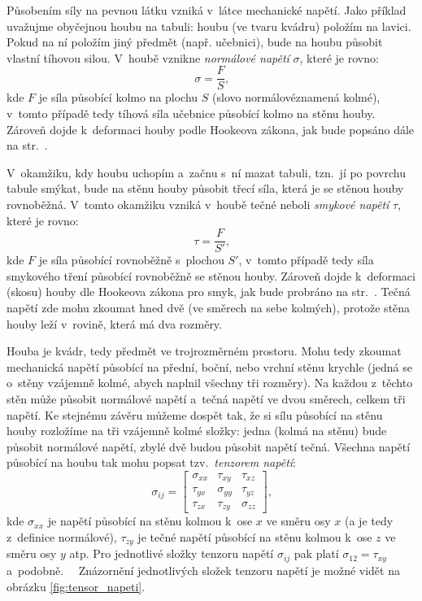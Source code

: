 \documentclass[12pt]{article}
\begin{document}
Působením síly na pevnou látku vzniká v~látce mechanické napětí. Jako příklad uvažujme obyčejnou houbu na tabuli: houbu (ve tvaru kvádru) položím na lavici. Pokud na ní položím jiný předmět (např. učebnici), bude na houbu působit vlastní tíhovou silou. V~houbě vznikne \emph{normálové napětí} $\sigma$, které je rovno: 
\begin{equation}
    \sigma = \frac{F}{S}\text{,}
\end{equation}
kde $F$ je síla působící kolmo na plochu $S$ (slovo \glqq normálové\grqq\space znamená kolmé), v~tomto případě tedy tíhová síla učebnice působící kolmo na stěnu houby. Zároveň dojde k~deformaci houby podle Hookeova zákona, jak bude popsáno dále na str.~\pageref{sec:Hookeův_zákon}.
\par
\noindent V~okamžiku, kdy houbu uchopím a~začnu s~ní mazat tabuli, tzn.~jí po povrchu tabule smýkat, bude na stěnu houby působit třecí síla, která je se stěnou houby rovnoběžná. V~tomto okamžiku vzniká v~houbě tečné neboli \emph{smykové napětí} $\tau$, které je rovno: 
\begin{equation}
    \tau = \frac{F}{S'}\text{,}
    \label{eq:napeti_tau}
\end{equation}
kde $F$ je síla působící rovnoběžně s~plochou $S'$, v~tomto případě tedy síla smykového tření působící rovnoběžně se stěnou houby. Zároveň dojde k~deformaci (skosu) houby dle Hookeova zákona pro smyk, jak bude probráno na str.~\pageref{sec:Hookeův_zákon}. Tečná napětí zde mohu zkoumat hned dvě (ve směrech na sebe kolmých), protože stěna houby leží v~rovině, která má dva rozměry.
~\cite{wiki:Mechanické_napětí}
\par\noindent
Houba je kvádr, tedy předmět ve trojrozměrném prostoru. Mohu tedy zkoumat mechanická napětí působící na přední, boční, nebo vrchní stěnu krychle (jedná se o~stěny vzájemně kolmé, abych naplnil všechny tři rozměry). Na každou z~těchto stěn může působit normálové napětí a~tečná napětí ve dvou směrech, celkem tři napětí. Ke stejnému závěru můžeme dospět tak, že si sílu působící na stěnu houby rozložíme na tři vzájemně kolmé složky: jedna (kolmá na stěnu) bude působit normálové napětí, zbylé dvě budou působit napětí tečná. Všechna napětí působící na houbu tak mohu popsat tzv.~\emph{tenzorem napětí}:
\begin{equation}
    \sigma_{ij} = 
    \begin{bmatrix}
        \sigma_{xx} & \tau_{xy} & \tau_{xz}\\
        \tau_{yx} & \sigma_{yy} & \tau_{yz}\\
        \tau_{zx} & \tau_{zy} & \sigma_{zz}
    \end{bmatrix}
    \text{,}
\end{equation}
kde $\sigma_{xx}$ je napětí působící na stěnu kolmou k~ose $x$ ve směru osy $x$ (a je tedy z~definice normálové), $\tau_{zy}$ je tečné napětí působící na stěnu kolmou k~ose $z$ ve směru osy $y$ atp. Pro jednotlivé složky tenzoru napětí $\sigma_{ij}$ pak platí $\sigma_{12} = \tau_{xy}$ a~podobně.~\cite{wiki:Stress_mechanics}~\cite{wiki:Cauchy_stress_tensor} Znázornění jednotlivých složek tenzoru napětí je možné vidět na obrázku \ref{fig:tensor_napeti}.
\end{document}
